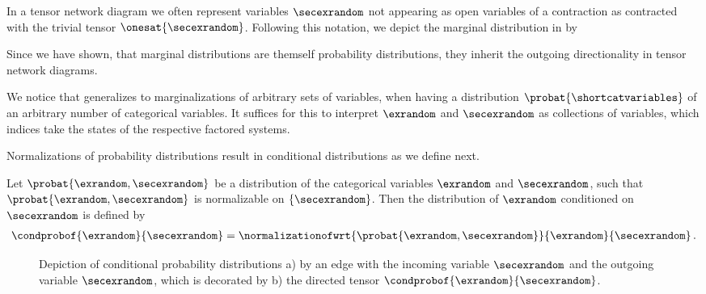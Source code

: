 In a tensor network diagram we often represent variables $\secexrandom$ not appearing as open variables of a contraction as contracted with the trivial tensor $\onesat{\secexrandom}$.
Following this notation, we depict the marginal distribution in  by
\begin{center}
    
\end{center}
Since we have shown, that marginal distributions are themself probability distributions, they inherit the outgoing directionality in tensor network diagrams.

We notice that  generalizes to marginalizations of arbitrary sets of variables, when having a distribution $\probat{\shortcatvariables}$ of an arbitrary number of categorical variables.
It suffices for this to interpret $\exrandom$ and $\secexrandom$ as collections of variables, which indices take the states of the respective factored systems.


Normalizations of probability distributions result in conditional distributions as we define next.

\begin{definition}
    \label{def:conditionalProbability}
    Let $\probat{\exrandom,\secexrandom}$ be a distribution of the categorical variables $\exrandom$ and $\secexrandom$, such that $\probat{\exrandom,\secexrandom}$ is normalizable on $\{\secexrandom\}$.
    Then the distribution of $\exrandom$ conditioned on $\secexrandom$ is defined by
    \begin{align*}
        \condprobof{\exrandom}{\secexrandom}
        = \normalizationofwrt{\probat{\exrandom,\secexrandom}}{\exrandom}{\secexrandom} \, .
    \end{align*}
\end{definition}

\begin{figure}[t]
    \begin{center}
        
    \end{center}
    \caption{Depiction of conditional probability distributions a) by an edge with the incoming variable $\secexrandom$ and the outgoing variable $\secexrandom$, which is decorated by b) the directed tensor $\condprobof{\exrandom}{\secexrandom}$. }
    \label{fig:conditionalDistribution}
\end{figure}


